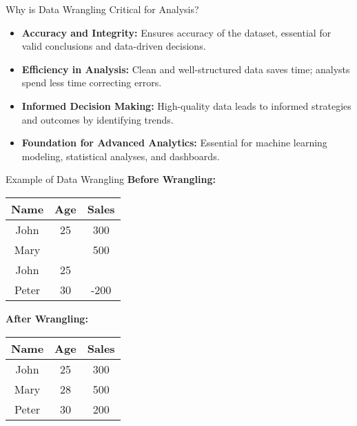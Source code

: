 \documentclass[aspectratio=169]{beamer}
\begin{document}
\begin{frame}[fragile]{Why is Data Wrangling Critical for Analysis?}
    \begin{itemize}
        \item \textbf{Accuracy and Integrity:} Ensures accuracy of the dataset, essential for valid conclusions and data-driven decisions.
        \item \textbf{Efficiency in Analysis:} Clean and well-structured data saves time; analysts spend less time correcting errors.
        \item \textbf{Informed Decision Making:} High-quality data leads to informed strategies and outcomes by identifying trends.
        \item \textbf{Foundation for Advanced Analytics:} Essential for machine learning modeling, statistical analyses, and dashboards.
    \end{itemize}
\end{frame}

\begin{frame}[fragile]{Example of Data Wrangling}
    \textbf{Before Wrangling:}

    \begin{center}
    \begin{tabular}{|c|c|c|}
    \hline
    Name   & Age & Sales \\
    \hline
    John   & 25  & 300   \\
    Mary   &     & 500   \\
    John   & 25  &    \\
    Peter  & 30  & -200  \\
    \hline
    \end{tabular}
    \end{center}

    \textbf{After Wrangling:}

    \begin{center}
    \begin{tabular}{|c|c|c|}
    \hline
    Name   & Age & Sales \\
    \hline
    John   & 25  & 300   \\
    Mary   & 28  & 500   \\  %
    Peter  & 30  & 200   \\  %
    \hline
    \end{tabular}
    \end{center}
\end{frame}
\end{document}
